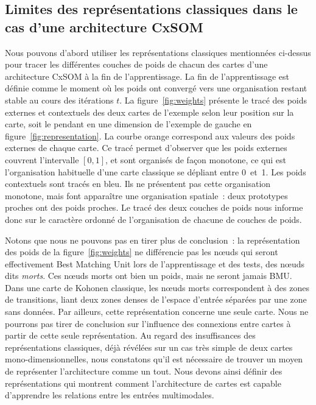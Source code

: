\documentclass[../main]{subfiles}
\begin{document}
\subsection{Limites des représentations classiques dans le cas d'une architecture CxSOM}

Nous pouvons d'abord utiliser les représentations classiques mentionnées ci-dessus pour tracer les différentes couches de poids de chacun des cartes d'une architecture CxSOM à la fin de l'apprentissage.
La fin de l'apprentissage est définie comme le moment où les poids ont convergé vers une organisation restant stable au cours des itérations $t$.
La figure~\ref{fig:weights} présente le tracé des poids externes et contextuels des deux cartes de l'exemple selon leur position sur la carte, soit le pendant en une dimension de l'exemple de gauche en figure~\ref{fig:representation}.
La courbe orange correspond aux valeurs des poids externes de chaque carte.
Ce tracé permet d'observer que les poids externes couvrent l'intervalle $[0,1]$, et sont organisés de façon monotone, ce qui est l'organisation habituelle d'une carte classique se dépliant entre 0~et~1.
Les poids contextuels sont tracés en bleu. Ils ne présentent pas cette organisation monotone, mais font apparaître une organisation spatiale~: deux prototypes proches ont des poids proches. 
Le tracé des deux couches de poids nous informe donc sur le caractère ordonné de l'organisation de chacune de couches de poids. 

Notons que nous ne pouvons pas en tirer plus de conclusion~: la représentation des poids de la figure~\ref{fig:weights} ne différencie pas les n\oe{}uds qui seront effectivement Best Matching Unit lors de l'apprentissage et des tests, des n\oe{}uds dits \emph{morts}.
Ces n\oe{}uds morts ont bien un poids, mais ne seront jamais BMU.
Dans une carte de Kohonen classique, les n\oe{}uds morts correspondent à des zones de transitions, liant deux zones denses de l'espace d'entrée séparées par une zone sans données.
Par ailleurs, cette représentation concerne une seule carte. Nous ne pourrons pas tirer de conclusion sur l'influence des connexions entre cartes à partir de cette seule représentation.
Au regard des insuffisances des représentations classiques, déjà révélées sur un cas très simple de deux cartes mono-dimensionnelles, nous constatons qu'il est nécessaire de trouver un moyen de représenter l'architecture comme un tout. 
Nous devons ainsi définir des représentations qui montrent comment l'architecture de cartes est capable d'apprendre les relations entre les entrées multimodales.
\end{document}
